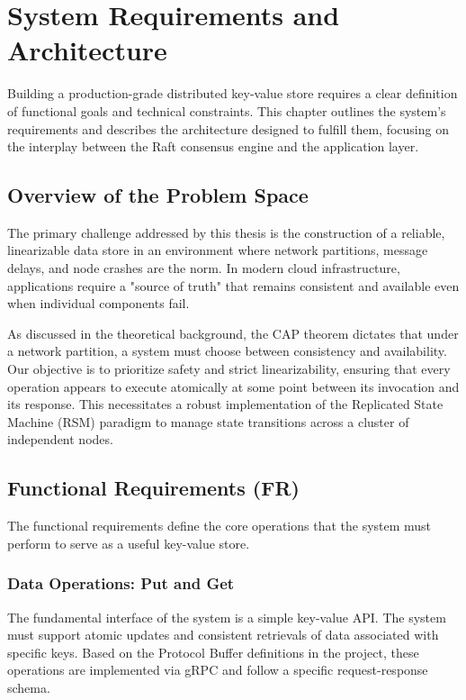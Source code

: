 \chapter{System Requirements and Architecture}
\label{ch:system_architecture}

Building a production-grade distributed key-value store requires a clear definition of functional goals and technical constraints. This chapter outlines the system's requirements and describes the architecture designed to fulfill them, focusing on the interplay between the Raft consensus engine and the application layer.

\section{Overview of the Problem Space}
The primary challenge addressed by this thesis is the construction of a reliable, linearizable data store in an environment where network partitions, message delays, and node crashes are the norm. In modern cloud infrastructure, applications require a "source of truth" that remains consistent and available even when individual components fail.

As discussed in the theoretical background, the CAP theorem dictates that under a network partition, a system must choose between consistency and availability. Our objective is to prioritize safety and strict linearizability, ensuring that every operation appears to execute atomically at some point between its invocation and its response. This necessitates a robust implementation of the Replicated State Machine (RSM) paradigm to manage state transitions across a cluster of independent nodes.

\section{Functional Requirements (FR)}
The functional requirements define the core operations that the system must perform to serve as a useful key-value store.

\subsection{Data Operations: Put and Get}
The fundamental interface of the system is a simple key-value API. The system must support atomic updates and consistent retrievals of data associated with specific keys. Based on the Protocol Buffer definitions in the project, these operations are implemented via gRPC and follow a specific request-response schema.

